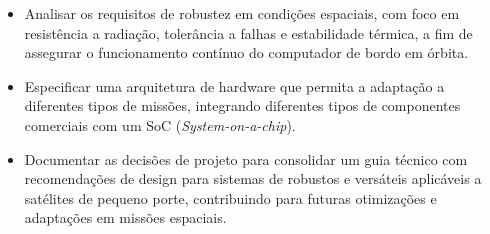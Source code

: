 \begin{itemize}
    \item Analisar os requisitos de robustez em condições espaciais, com foco em resistência a radiação, tolerância a falhas e estabilidade térmica, a fim de assegurar o funcionamento contínuo do computador de bordo em órbita.
    \item Especificar uma arquitetura de hardware que permita a adaptação a diferentes tipos de missões, integrando diferentes tipos de componentes comerciais com um SoC (\textit{System-on-a-chip}).
    \item  Documentar as decisões de projeto para consolidar um guia técnico com recomendações de design para sistemas de robustos e versáteis aplicáveis a satélites de pequeno porte, contribuindo para futuras otimizações e adaptações em missões espaciais.
\end{itemize}
